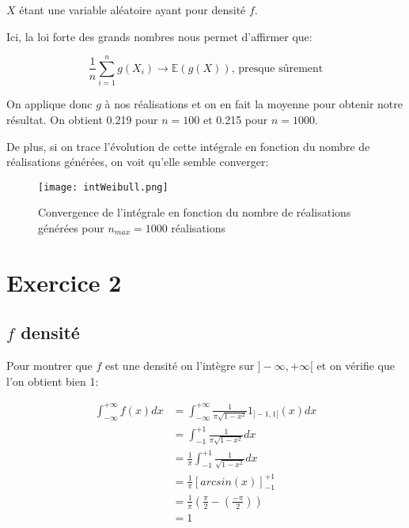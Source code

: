 \documentclass{article}
\begin{document}
\begin{multicols}{2}
$X$ étant une variable aléatoire ayant pour densité $f$.

Ici, la loi forte des grands nombres nous permet d'affirmer que:

\begin{equation}
    \frac{1}{n} \sum_{i = 1}^n g(X_i) \to \mathbb{E}(g(X)) \text{, presque sûrement}
\end{equation}

On applique donc $g$ à nos réalisations et on en fait la moyenne pour obtenir
notre résultat. On obtient 0.219 pour $n = 100$ et 0.215 pour $n = 1000$.

De plus, si on trace l'évolution de cette intégrale en fonction du nombre de
réalisations générées, on voit qu'elle semble converger:

\begin{figure}[H]
    \begin{center}
        \texttt{[image: intWeibull.png]}
        \centering
        \captionsetup{justification=centering}
        \caption{\label{fig:intWeibull}Convergence de l'intégrale en fonction du nombre de réalisations générées pour $n_{max} = 1000$ réalisations}
    \end{center}
\end{figure}


\section{Exercice 2}\label{sec:ex2}

\subsection{$f$ densité}\label{subsec:ex21}

Pour montrer que $f$ est une densité on l'intègre sur $]-\infty, +\infty[$ et on
vérifie que l'on obtient bien 1:

\begin{equation}
    \begin{split}
        \int_{-\infty}^{+\infty} f(x) dx
        &= \int_{-\infty}^{+\infty} \frac{1}{\pi \sqrt{1 - x^2}} 1_{]-1, 1[}(x) dx \\
        &= \int_{-1}^{+1} \frac{1}{\pi \sqrt{1 - x^2}} dx \\
        &= \frac{1}{\pi} \int_{-1}^{+1} \frac{1}{\sqrt{1 - x^2}} dx \\
        &= \frac{1}{\pi} [arcsin(x)]_{-1}^{+1} \\
        &= \frac{1}{\pi} \left(\frac{\pi}{2} - \left(\frac{-\pi}{2}\right)\right) \\
        &= 1
    \end{split}
\end{equation}


\end{multicols}
\end{document}
